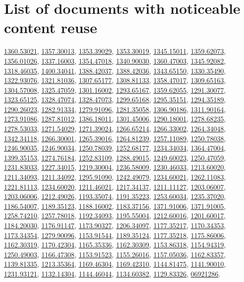 \documentclass{llncs}
\newcommand{\zbl}[1]{\href{https://zbmath.org/?q=an:#1}{\textsf{#1}}}
\begin{document}
\section{List of documents with noticeable content reuse}\label{sec.list}
\scriptsize
\zbl{1360.53021},
\zbl{1357.30013},
\zbl{1353.39029},
\zbl{1353.30019},
\zbl{1345.15011},
\zbl{1359.62073},
\zbl{1356.01026},
\zbl{1337.16003},
\zbl{1354.47018},
\zbl{1340.90030},
\zbl{1360.47003},
\zbl{1345.92082},
\zbl{1318.46035},
\zbl{1400.34041},
\zbl{1388.42037},
\zbl{1388.42036},
\zbl{1343.65150},
\zbl{1330.35490},
\zbl{1322.93076},
\zbl{1321.81036},
\zbl{1307.65177},
\zbl{1308.81133},
\zbl{1358.47017},
\zbl{1309.65163},
\zbl{1304.57008},
\zbl{1325.47059},
\zbl{1301.16002},
\zbl{1293.65167},
\zbl{1359.62055},
\zbl{1291.30077},
\zbl{1323.65125},
\zbl{1328.47074},
\zbl{1328.47073},
\zbl{1299.65168},
\zbl{1295.35151},
\zbl{1294.35189},
\zbl{1290.26023},
\zbl{1282.91334},
\zbl{1279.91096},
\zbl{1281.35058},
\zbl{1306.90186},
\zbl{1311.90164},
\zbl{1273.91086},
\zbl{1287.81012},
\zbl{1386.18011},
\zbl{1301.45006},
\zbl{1290.18001},
\zbl{1278.68235},
\zbl{1278.53033},
\zbl{1271.54029},
\zbl{1271.39024},
\zbl{1266.65214},
\zbl{1266.33002},
\zbl{1264.34048},
\zbl{1342.34118},
\zbl{1266.30001},
\zbl{1265.39016},
\zbl{1264.81239},
\zbl{1257.11089},
\zbl{1250.78038},
\zbl{1246.90035},
\zbl{1246.90034},
\zbl{1250.78039},
\zbl{1252.68177},
\zbl{1234.34034},
\zbl{1364.47004},
\zbl{1399.35153},
\zbl{1274.76184},
\zbl{1252.83109},
\zbl{1288.49015},
\zbl{1249.60023},
\zbl{1250.47059},
\zbl{1231.83033},
\zbl{1227.34015},
\zbl{1219.30004},
\zbl{1236.58009},
\zbl{1230.46033},
\zbl{1213.60020},
\zbl{1211.34093},
\zbl{1211.34092},
\zbl{1295.91090},
\zbl{1242.49079},
\zbl{1234.60021},
\zbl{1262.11083},
\zbl{1221.81113},
\zbl{1234.60020},
\zbl{1211.46021},
\zbl{1217.34137},
\zbl{1211.11127},
\zbl{1203.06007},
\zbl{1203.06006},
\zbl{1212.49026},
\zbl{1193.35074},
\zbl{1191.35223},
\zbl{1253.60034},
\zbl{1235.37020},
\zbl{1186.54007},
\zbl{1189.35123},
\zbl{1188.16002},
\zbl{1183.37156},
\zbl{1371.91006},
\zbl{1371.91005},
\zbl{1258.74210},
\zbl{1257.78018},
\zbl{1192.34093},
\zbl{1195.55004},
\zbl{1212.60016},
\zbl{1201.60017},
\zbl{1184.20030},
\zbl{1176.91147},
\zbl{1173.90327},
\zbl{1206.34097},
\zbl{1177.35217},
\zbl{1170.34353},
\zbl{1173.34354},
\zbl{1279.90096},
\zbl{1153.91544},
\zbl{1189.35124},
\zbl{1177.35218},
\zbl{1175.86006},
\zbl{1162.30319},
\zbl{1170.42304},
\zbl{1165.35336},
\zbl{1162.30309},
\zbl{1153.86318},
\zbl{1154.94319},
\zbl{1250.49003},
\zbl{1166.47308},
\zbl{1153.91523},
\zbl{1155.26016},
\zbl{1157.05036},
\zbl{1162.83357},
\zbl{1139.81335},
\zbl{1213.35364},
\zbl{1169.46304},
\zbl{1169.42310},
\zbl{1144.81475},
\zbl{1141.90010},
\zbl{1231.93121},
\zbl{1132.14304},
\zbl{1144.46044},
\zbl{1134.60382},
\zbl{1129.83326},
\zbl{06921286}.
\end{document}
